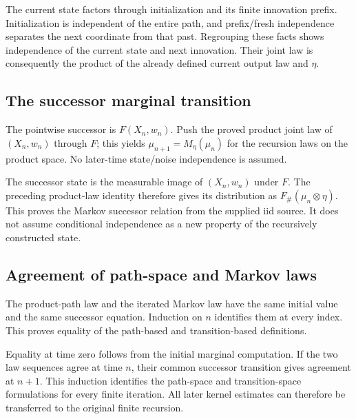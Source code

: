 \documentclass[11pt,a4paper]{report}
\begin{document}
The current state factors through initialization and its finite innovation prefix. Initialization is independent of the entire path, and prefix/\allowbreak{}fresh independence separates the next coordinate from that past. Regrouping these facts shows independence of the current state and next innovation. Their joint law is consequently the product of the already defined current output law and \(\eta\).

\subsection{\texorpdfstring{The successor marginal transition}{The successor marginal transition}}
\label{report-step-UnadjustedLangevin-MarkovLaw-lean-8}


The pointwise successor is \(F(X_n,w_n)\). Push the proved product joint law of \((X_n,w_n)\) through \(F\); this yields \(\mu_{n+1}=M_\eta(\mu_n)\) for the recursion laws on the product space. No later-time state/\allowbreak{}noise independence is assumed.



The successor state is the measurable image of \((X_n,w_n)\) under \(F\). The preceding product-law identity therefore gives its distribution as \(F_\#(\mu_n\otimes\eta)\). This proves the Markov successor relation from the supplied iid source. It does not assume conditional independence as a new property of the recursively constructed state.

\subsection{\texorpdfstring{Agreement of path-space and Markov laws}{Agreement of path-space and Markov laws}}
\label{report-step-UnadjustedLangevin-MarkovLaw-lean-9}


The product-path law and the iterated Markov law have the same initial value and the same successor equation. Induction on \(n\) identifies them at every index. This proves equality of the path-based and transition-based definitions.



Equality at time zero follows from the initial marginal computation. If the two law sequences agree at time \(n\), their common successor transition gives agreement at \(n+1\). This induction identifies the path-space and transition-space formulations for every finite iteration. All later kernel estimates can therefore be transferred to the original finite recursion.
\end{document}
